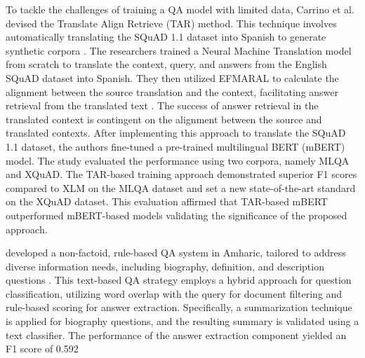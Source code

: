 To tackle the challenges of training a QA model with limited data, Carrino et al. devised the Translate Align Retrieve (TAR) method. This technique involves automatically translating the SQuAD 1.1 dataset into Spanish to generate synthetic corpora \cite{carrino2019automatic}. The researchers trained a Neural Machine Translation model from scratch to translate the context, query, and answers from the English SQuAD dataset into Spanish. They then utilized EFMARAL to calculate the alignment between the source translation and the context, facilitating answer retrieval from the translated text \cite{ostling2023efmaral}. The success of answer retrieval in the translated context is contingent on the alignment between the source and translated contexts. After implementing this approach to translate the SQuAD 1.1 dataset, the authors fine-tuned a pre-trained multilingual BERT (mBERT) model. The study evaluated the performance using two corpora, namely MLQA and XQuAD. The TAR-based training approach demonstrated superior F1 scores compared to XLM on the MLQA dataset and set a new state-of-the-art standard on the XQuAD dataset. This evaluation affirmed that TAR-based mBERT outperformed mBERT-based models validating the significance of the proposed approach.

\cite{abedissa2023amqa} developed a non-factoid, rule-based QA system in Amharic, tailored to address diverse information needs, including biography, definition, and description questions \cite{abedissa2019amharic}. This text-based QA strategy employs a hybrid approach for question classification, utilizing word overlap with the query for document filtering and rule-based scoring for answer extraction. Specifically, a summarization technique is applied for biography questions, and the resulting summary is validated using a text classifier. The performance of the answer extraction component yielded an F1 score of 0.592%

